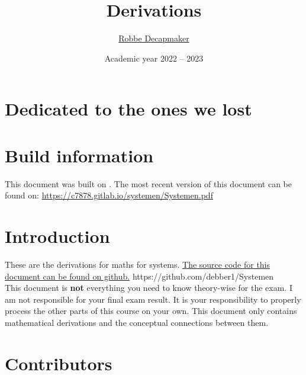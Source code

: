 \documentclass[a4paper,kul]{kulakarticle} %
\date{Academic year 2022 -- 2023}
\title{Derivations}
\author{\href{https://github.com/debber1}{Robbe Decapmaker}}
\begin{document}
\maketitle
\section*{Dedicated to the ones we lost}
\section*{Build information}
This document was built on \DTMNow.
\newline
The most recent version of this document can be found on: \href{https://c7878.gitlab.io/systemen/Systemen.pdf}{https://c7878.gitlab.io/systemen/Systemen.pdf}
\section*{Introduction}

These are the derivations for maths for systems. \href{https://github.com/debber1/Systemen}{The source code for this document can be found on github.} 
https://github.com/debber1/Systemen\\
\newline
This document is \textbf{not} everything you need to know theory-wise for the exam. I am not responsible for your final exam result. It is your responsibility to properly process the other parts of this course on your own.  This document only contains mathematical derivations and the conceptual connections between them.\\

\section*{Contributors}


\newpage

\newpage

\newpage

\end{document}
